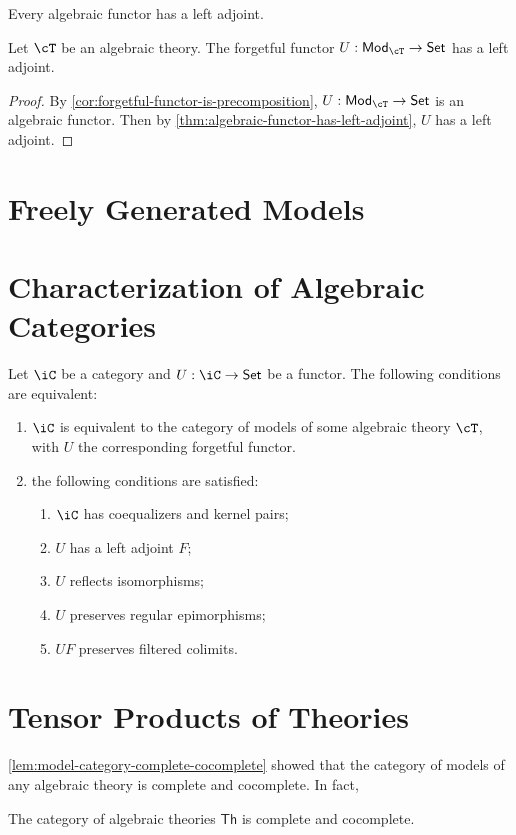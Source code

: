 \documentclass{amsart}
\begin{document}
\begin{thm}\label{thm:algebraic-functor-has-left-adjoint}
  Every algebraic functor has a left adjoint.
\end{thm}

\begin{cor}
  Let $\cT$ be an algebraic theory.
  The forgetful functor $U : \mathsf{Mod}_{\cT} \to \mathsf{Set}$ has a left adjoint.
\end{cor}
\begin{proof}
  By \cref{cor:forgetful-functor-is-precomposition}, $U : \mathsf{Mod}_{\cT} \to \mathsf{Set}$ is an algebraic functor.
  Then by \cref{thm:algebraic-functor-has-left-adjoint}, $U$ has a left adjoint.
\end{proof}

\section{Freely Generated Models}
\label{sec:freely-generated-models}

\section{Characterization of Algebraic Categories}
\label{sec:characterization-of-algebraic-categories}

\begin{thm}
  Let $\iC$ be a category and $U : \iC \to \mathsf{Set}$ be a functor.
  The following conditions are equivalent:
  \begin{enumerate}
  \item $\iC$ is equivalent to the category of models of some algebraic theory $\cT$, with $U$ the corresponding forgetful functor.
  \item the following conditions are satisfied:
    \begin{enumerate}
    \item $\iC$ has coequalizers and kernel pairs;
    \item $U$ has a left adjoint $F$;
    \item $U$ reflects isomorphisms;
    \item $U$ preserves regular epimorphisms;
    \item $UF$ preserves filtered colimits.
    \end{enumerate}
  \end{enumerate}
\end{thm}

\section{Tensor Products of Theories}
\label{sec:tensor-products-of-theories}

\cref{lem:model-category-complete-cocomplete} showed that the category of models of any algebraic theory is complete and cocomplete.
In fact,

\begin{lem}
  The category of algebraic theories $\mathsf{Th}$ is complete and cocomplete.
\end{lem}




\end{document}
